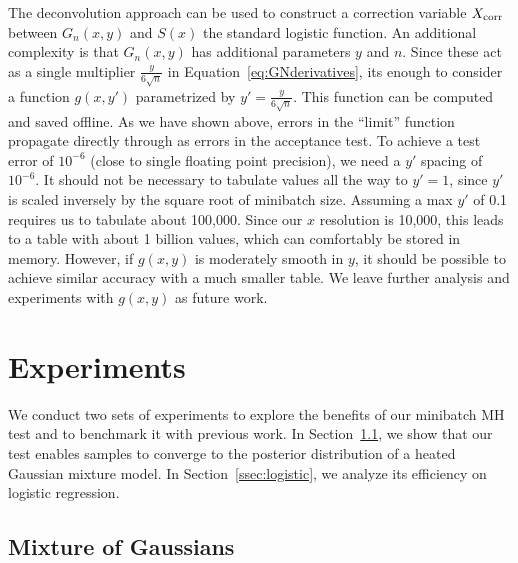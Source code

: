 \documentclass{article}
\begin{document}
The deconvolution approach can be used to construct a correction variable
$X_{\rm corr}$ between $G_n(x,y)$ and $S(x)$ the standard logistic function. An
additional complexity is that $G_n(x,y)$ has additional parameters $y$ and $n$.
Since these act as a single multiplier $\frac{y}{6\sqrt{n}}$ in
Equation~\ref{eq:GNderivatives}, its enough to consider a function $g(x,y')$
parametrized by $y'= \frac{y}{6\sqrt{n}}$. This function can be computed and
saved offline. As we have shown above, errors in the ``limit'' function
propagate directly through as errors in the acceptance test.  To achieve a test
error of $10^{-6}$ (close to single floating point precision), we need a $y'$
spacing of $10^{-6}$. It should not be necessary to tabulate values all the way to
$y'=1$, since $y'$ is scaled inversely by the square root of minibatch size.
Assuming a max $y'$ of 0.1 requires us to tabulate about 100,000.  Since our $x$
resolution is 10,000, this leads to a table with about 1 billion values, which
can comfortably be stored in memory.  However, if $g(x,y)$ is moderately smooth
in $y$, it should be possible to achieve similar accuracy with a much smaller
table. We leave further analysis and experiments with $g(x,y)$ as future work.



\section{Experiments}\label{sec:experiments}

We conduct two sets of experiments to explore the benefits of our minibatch MH
test and to benchmark it with previous work. In Section~\ref{ssec:gaussians}, we
show that our test enables samples to converge to the posterior distribution of
a heated Gaussian mixture model. In Section~\ref{ssec:logistic}, we analyze its
efficiency on logistic regression.

\subsection{Mixture of Gaussians}\label{ssec:gaussians}
\end{document}
